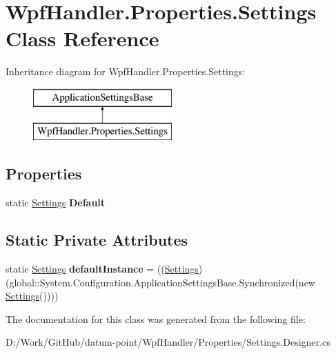 \hypertarget{class_wpf_handler_1_1_properties_1_1_settings}{}\section{Wpf\+Handler.\+Properties.\+Settings Class Reference}
\label{class_wpf_handler_1_1_properties_1_1_settings}
Inheritance diagram for Wpf\+Handler.\+Properties.\+Settings\+:\begin{figure}[H]
\begin{center}
\leavevmode
\includegraphics[height=2.000000cm]{d7/d4f/class_wpf_handler_1_1_properties_1_1_settings}
\end{center}
\end{figure}
\subsection*{Properties}
\begin{DoxyCompactItemize}
\item 
\mbox{\label{class_wpf_handler_1_1_properties_1_1_settings_a252db64811cbf5a2fccc03433c9566c3}} 
static \mbox{\hyperlink{class_wpf_handler_1_1_properties_1_1_settings}{Settings}} {\bfseries Default}
\end{DoxyCompactItemize}
\subsection*{Static Private Attributes}
\begin{DoxyCompactItemize}
\item 
\mbox{\label{class_wpf_handler_1_1_properties_1_1_settings_a7b2e360d53ec59976635347e45223008}} 
static \mbox{\hyperlink{class_wpf_handler_1_1_properties_1_1_settings}{Settings}} {\bfseries default\+Instance} = ((\mbox{\hyperlink{class_wpf_handler_1_1_properties_1_1_settings}{Settings}})(global\+::\+System.\+Configuration.\+Application\+Settings\+Base.\+Synchronized(new \mbox{\hyperlink{class_wpf_handler_1_1_properties_1_1_settings}{Settings}}())))
\end{DoxyCompactItemize}


The documentation for this class was generated from the following file\+:\begin{DoxyCompactItemize}
\item 
D\+:/\+Work/\+Git\+Hub/datum-\/point/\+Wpf\+Handler/\+Properties/Settings.\+Designer.\+cs\end{DoxyCompactItemize}

